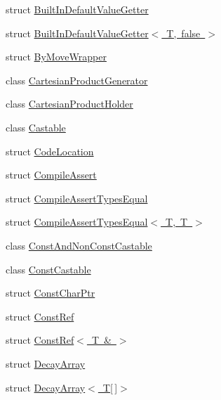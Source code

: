 \begin{DoxyCompactItemize}
\item 
struct \mbox{\hyperlink{structtesting_1_1internal_1_1_built_in_default_value_getter}{Built\+In\+Default\+Value\+Getter}}
\item 
struct \mbox{\hyperlink{structtesting_1_1internal_1_1_built_in_default_value_getter_3_01_t_00_01false_01_4}{Built\+In\+Default\+Value\+Getter$<$ T, false $>$}}
\item 
struct \mbox{\hyperlink{structtesting_1_1internal_1_1_by_move_wrapper}{By\+Move\+Wrapper}}
\item 
class \mbox{\hyperlink{classtesting_1_1internal_1_1_cartesian_product_generator}{Cartesian\+Product\+Generator}}
\item 
class \mbox{\hyperlink{classtesting_1_1internal_1_1_cartesian_product_holder}{Cartesian\+Product\+Holder}}
\item 
class \mbox{\hyperlink{classtesting_1_1internal_1_1_castable}{Castable}}
\item 
struct \mbox{\hyperlink{structtesting_1_1internal_1_1_code_location}{Code\+Location}}
\item 
struct \mbox{\hyperlink{structtesting_1_1internal_1_1_compile_assert}{Compile\+Assert}}
\item 
struct \mbox{\hyperlink{structtesting_1_1internal_1_1_compile_assert_types_equal}{Compile\+Assert\+Types\+Equal}}
\item 
struct \mbox{\hyperlink{structtesting_1_1internal_1_1_compile_assert_types_equal_3_01_t_00_01_t_01_4}{Compile\+Assert\+Types\+Equal$<$ T, T $>$}}
\item 
class \mbox{\hyperlink{classtesting_1_1internal_1_1_const_and_non_const_castable}{Const\+And\+Non\+Const\+Castable}}
\item 
class \mbox{\hyperlink{classtesting_1_1internal_1_1_const_castable}{Const\+Castable}}
\item 
struct \mbox{\hyperlink{structtesting_1_1internal_1_1_const_char_ptr}{Const\+Char\+Ptr}}
\item 
struct \mbox{\hyperlink{structtesting_1_1internal_1_1_const_ref}{Const\+Ref}}
\item 
struct \mbox{\hyperlink{structtesting_1_1internal_1_1_const_ref_3_01_t_01_6_01_4}{Const\+Ref$<$ T \& $>$}}
\item 
struct \mbox{\hyperlink{structtesting_1_1internal_1_1_decay_array}{Decay\+Array}}
\item 
struct \mbox{\hyperlink{structtesting_1_1internal_1_1_decay_array_3_01_t[]_4}{Decay\+Array$<$ T\mbox{[}$\,$\mbox{]}$>$}}
\item 

\end{DoxyCompactItemize}
